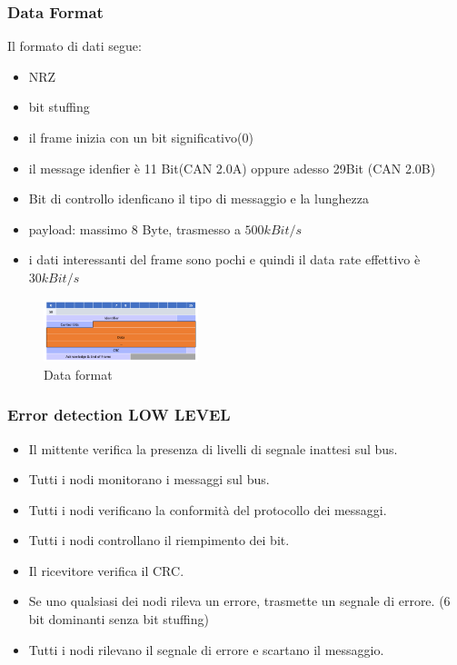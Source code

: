 \subsubsection{Data Format}

Il formato di dati segue:
\begin{itemize}
  \item NRZ
  \item bit stuffing
  \item il frame inizia con un bit significativo(0)
  \item il message idenfier è 11 Bit(CAN 2.0A) oppure adesso 29Bit (CAN 2.0B)
  \item Bit di controllo idenficano il tipo di messaggio e la lunghezza
  \item payload: massimo 8 Byte, trasmesso a $500kBit/s$
  \item i dati interessanti del frame sono pochi e quindi il data rate effettivo è $30kBit/s$
\end{itemize}

\begin{figure}[!ht]
  \centering
  \includegraphics[width=0.4\textwidth]{./images/can_data_format_2.png}
  \caption{Data format}
  \label{fig:can_format_2}
\end{figure}



\subsubsection{Error detection LOW LEVEL}
\begin{itemize}
    \item Il mittente verifica la presenza di livelli di segnale inattesi sul bus.
    \item Tutti i nodi monitorano i messaggi sul bus.
    \item Tutti i nodi verificano la conformità del protocollo dei messaggi.
    \item Tutti i nodi controllano il riempimento dei bit.
    \item Il ricevitore verifica il CRC.
    \item Se uno qualsiasi dei nodi rileva un errore, trasmette un segnale di errore.
      (6 bit dominanti senza bit stuffing)
    \item Tutti i nodi rilevano il segnale di errore e scartano il messaggio.
\end{itemize}





